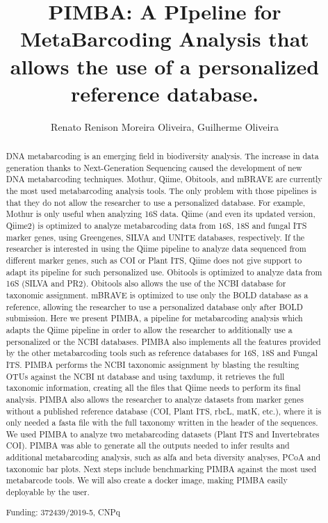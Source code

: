 \documentclass[twoside]{article}
\title{\vspace{-15mm}\fontsize{24pt}{10pt}\selectfont\textbf{ PIMBA: A PIpeline for MetaBarcoding Analysis that allows the use of a personalized reference database. }} %
\author{ Renato Renison Moreira Oliveira, Guilherme Oliveira }
\affil{ Universidade Federal de Minas Gerais }
\date{}
\begin{document}
  
  
  \maketitle %
  
  
  \thispagestyle{fancy} %
  
  
  \begin{abstract}
  DNA metabarcoding is an emerging field in biodiversity analysis. The increase in data generation thanks to Next-Generation Sequencing caused the development of new DNA metabarcoding techniques. Mothur,  Qiime,  Obitools,  and mBRAVE are currently the most used metabarcoding analysis tools. The only problem with those pipelines is that they do not allow the researcher to use a personalized database. For example,  Mothur is only useful when analyzing 16S data. Qiime (and even its updated version,  Qiime2) is optimized to analyze metabarcoding data from 16S,  18S and fungal ITS marker genes,  using Greengenes,  SILVA and UNITE databases,  respectively. If the researcher is interested in using the Qiime pipeline to analyze data sequenced from different marker genes,  such as COI or Plant ITS,  Qiime does not give support to adapt its pipeline for such personalized use. Obitools is optimized to analyze data from 16S (SILVA and PR2). Obitools also allows the use of the NCBI database for taxonomic assignment. mBRAVE is optimized to use only the BOLD database as a reference,  allowing the researcher to use a personalized database only after BOLD submission. Here we present PIMBA,  a pipeline for metabarcoding analysis which adapts the Qiime pipeline in order to allow the researcher to additionally use a personalized or the NCBI databases. PIMBA also implements all the features provided by the other metabarcoding tools such as reference databases for 16S,  18S and Fungal ITS. PIMBA performs the NCBI taxonomic assignment by blasting the resulting OTUs against the NCBI nt database and using taxdump,  it retrieves the full taxonomic information,  creating all the files that Qiime needs to perform its final analysis. PIMBA also allows the researcher to analyze datasets from marker genes without a published reference database (COI,  Plant ITS,  rbcL,  matK,  etc.),  where it is only needed a fasta file with the full taxonomy written in the header of the sequences. We used PIMBA to analyze two metabarcoding datasets (Plant ITS and Invertebrates COI). PIMBA was able to generate all the outputs needed to infer results and additional metabarcoding analysis,  such as alfa and beta diversity analyses,  PCoA and taxonomic bar plots. Next steps include benchmarking PIMBA against the most used metabarcode tools. We will also create a docker image,  making PIMBA easily deployable by the user.
  
  Funding: 372439/2019-5,  CNPq \\ 
  \end{abstract}
  
\end{document}
